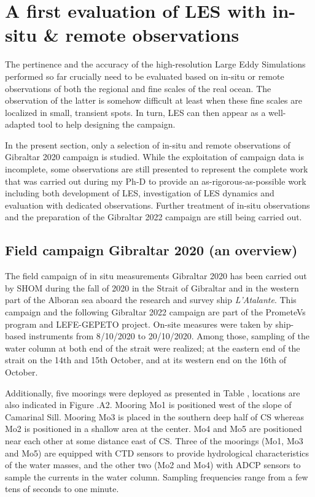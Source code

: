 
\section[A first evaluation of LES with in-situ \& remote observations]{A first evaluation of LES with in-situ \& remote observations}
\label{sectionCampagne}

The pertinence and the accuracy of the high-resolution Large Eddy Simulations performed so far crucially need to be evaluated based on in-situ or remote observations of both the regional and fine scales of the real ocean. The observation of the latter is somehow difficult at least when these fine scales are localized in small, transient spots. In turn, LES can then appear as a well-adapted tool to help designing the campaign.

In the present section, only a selection of in-situ and remote observations of Gibraltar 2020 campaign is studied. While the exploitation of campaign data is incomplete, some observations are still presented to represent the complete work that was carried out during my Ph-D to provide an as-rigorous-as-possible work including both development of LES, investigation of LES dynamics and evaluation with dedicated observations. Further treatment of in-situ observations and the preparation of the Gibraltar 2022 campaign are still being carried out.

\subsection{Field campaign Gibraltar 2020 (an overview)}
The field campaign of in situ measurements Gibraltar 2020 has been carried out by SHOM during the fall of 2020 in the Strait of Gibraltar and in the western part of the Alboran sea aboard the research and survey ship \textit{L'Atalante}. This campaign and the following Gibraltar 2022 campaign are part of the PrometeVs program and LEFE-GEPETO project. On-site measures were taken by ship-based instruments from 8/10/2020 to 20/10/2020. Among those, sampling of the water column at both end of the strait were realized; at the eastern end of the strait on the 14th and 15th October, and at its western end on the 16th of October.

Additionally, five moorings were deployed as presented in Table , locations are also indicated in Figure .A2. Mooring Mo1 is positioned west of the slope of Camarinal Sill. Mooring Mo3 is placed in the southern deep half of CS whereas Mo2 is positioned in a shallow area at the center. Mo4 and Mo5 are positioned near each other at some distance east of CS. Three of the moorings (Mo1, Mo3 and Mo5) are equipped with CTD sensors to provide hydrological characteristics of the water masses, and the other two (Mo2 and Mo4) with ADCP sensors to sample the currents in the water column. Sampling frequencies range from a few tens of seconds to one minute.

